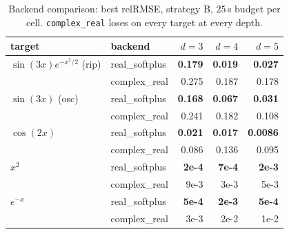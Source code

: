 \documentclass[11pt]{article}
\begin{document}
\begin{table}[h]
\centering\small
\caption{Backend comparison: best relRMSE, strategy B, $25\,$s budget per
cell. \texttt{complex\_real} loses on every target at every depth.}
\label{tab:complex}
\begin{tabular}{llrrr}
\toprule
target & backend & $d{=}3$ & $d{=}4$ & $d{=}5$ \\
\midrule
$\sin(3x) e^{-x^2/2}$ (rip) & real\_softplus & \textbf{0.179} & \textbf{0.019} & \textbf{0.027} \\
                            & complex\_real  & 0.275 & 0.187 & 0.178 \\
\addlinespace
$\sin(3x)$ (osc)            & real\_softplus & \textbf{0.168} & \textbf{0.067} & \textbf{0.031} \\
                            & complex\_real  & 0.241 & 0.182 & 0.108 \\
\addlinespace
$\cos(2x)$                  & real\_softplus & \textbf{0.021} & \textbf{0.017} & \textbf{0.0086} \\
                            & complex\_real  & 0.086 & 0.136 & 0.095 \\
\addlinespace
$x^2$                       & real\_softplus & \textbf{2e-4}   & \textbf{7e-4}   & \textbf{2e-3}   \\
                            & complex\_real  & 9e-3 & 3e-3 & 5e-3 \\
\addlinespace
$e^{-x}$                    & real\_softplus & \textbf{5e-4}   & \textbf{2e-3}   & \textbf{5e-4}   \\
                            & complex\_real  & 3e-3 & 2e-2 & 1e-2 \\
\bottomrule
\end{tabular}
\end{table}
\end{document}
